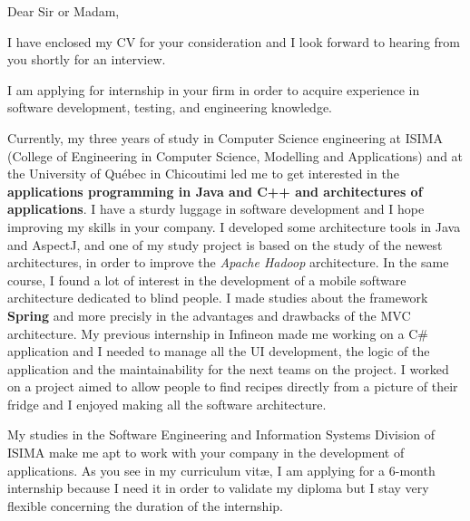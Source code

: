 
\date{\today}
\opening{Dear Sir or Madam,}
\closing{I have enclosed my CV for your consideration and I look forward to hearing from you shortly for an interview.}

\makelettertitle

I am applying for internship in your firm in order to acquire experience in software development, testing, and engineering knowledge.

Currently, my three years of study in Computer Science engineering at ISIMA (College of Engineering in Computer Science, Modelling and Applications) and at the University of Québec in Chicoutimi led me to get interested in the \textbf{applications programming in Java and C++ and architectures of applications}. I have a sturdy luggage in software development and I hope improving my skills in your company. I developed some architecture tools in Java and AspectJ, and one of my study project is based on the study of the newest architectures, in order to improve the \textit{Apache Hadoop} architecture. In the same course, I found a lot of interest in the development of a mobile software architecture dedicated to blind people. I made studies about the framework \textbf{Spring} and more precisly in the advantages and drawbacks of the MVC architecture. My previous internship in Infineon made me working on a C\# application and I needed to manage all the UI development, the logic of the application and the maintainability for the next teams on the project. I worked on a project aimed to allow people to find recipes directly from a picture of their fridge and I enjoyed making all the software architecture.

My studies in the Software Engineering and Information Systems Division of ISIMA make me apt to work with your company in the development of applications. As you see in my curriculum vit\ae{}, I am applying for a 6-month internship because I need it in order to validate my diploma but I stay very flexible concerning the duration of the internship.

\makeletterclosing
